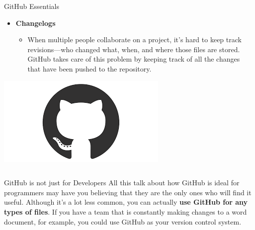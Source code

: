 \documentclass{beamer}
\begin{document}
\begin{frame}[fragile]
\begin{columns}[T]
\begin{column}{.3\textwidth}
\begin{block}{GitHub Essentials}
\begin{itemize}
    \begin{itemize}
        \item The social networking aspect of GitHub is probably its most powerful feature, allowing projects to grow more than just about any of the other features offered. Each user on GitHub has their own profile that acts like a resume of sorts, showing your past work and contributions to other projects via pull requests.
    \end{itemize}
    \item \textbf{Changelogs}
    \begin{itemize}
        \item When multiple people collaborate on a project, it’s hard to keep track revisions—who changed what, when, and where those files are stored. GitHub takes care of this problem by keeping track of all the changes that have been pushed to the repository.
    \end{itemize}
\end{itemize}

\end{block}

\begin{center}
\includegraphics[width=1\linewidth]{imagegit.png}
\end{center}

\end{column}
\end{columns}

\begin{block}{GitHub is not just for Developers}
All this talk about how GitHub is ideal for programmers may have you believing that they are the only ones who will find it useful. Although it’s a lot less common, you can actually \textbf{use GitHub for any types of files}. If you have a team that is constantly making changes to a word document, for example,  you could use GitHub as your version control system.
\end{block}


\end{frame}
\end{document}
